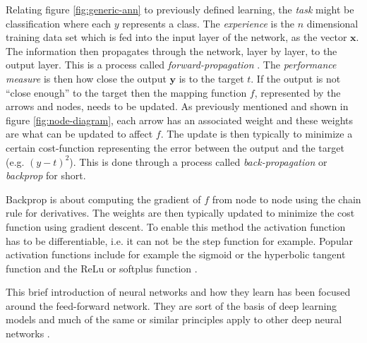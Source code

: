 \documentclass[../main.tex]{subfiles}
\begin{document}
Relating figure \ref{fig:generic-ann} to previously defined learning, the \textit{task} might be classification where each $y$ represents a class.
The \textit{experience} is the $n$ dimensional training data set which is fed into the input layer of the network, as the vector $\mathbf{x}$.
The information then propagates through the network, layer by layer, to the output layer. 
This is a process called \textit{forward-propagation} \cite{Goodfellow2016}.
The \textit{performance measure} is then how close the output $\mathbf{y}$ is to the target $t$.
If the output is not ``close enough'' to the target then the mapping function $f$, represented by the arrows and nodes, needs to be updated.
As previously mentioned and shown in figure \ref{fig:node-diagram}, each arrow has an associated weight and these weights are what can be updated to affect $f$.
The update is then typically to minimize a certain cost-function representing the error between the output and the target (e.g. $(y-t)^2$).
This is done through a process called \textit{back-propagation} or \textit{backprop} for short.

Backprop is about computing the gradient of $f$ from node to node using the chain rule for derivatives. 
The weights are then typically updated to minimize the cost function using gradient descent.
To enable this method the activation function has to be differentiable, i.e. it can not be the step function for example.
Popular activation functions include for example the sigmoid or the hyperbolic tangent function and the ReLu or softplus function \cite{Goodfellow2016, Haykin2009, Rojas1996}.

This brief introduction of neural networks and how they learn has been focused around the feed-forward network.
They are sort of the basis of deep learning models and much of the same or similar principles apply to other deep neural networks \cite{Goodfellow2016}.
\end{document}

